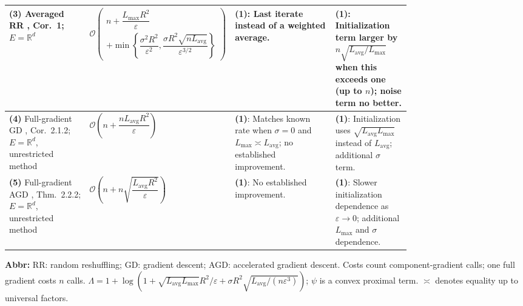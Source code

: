 \begin{table}[tp]
\begin{threeparttable}
\begin{tabularx}{\linewidth}{@{}>{\raggedright\arraybackslash}p{0.20\linewidth}>{\raggedright\arraybackslash}p{0.32\linewidth}>{\raggedright\arraybackslash}p{0.25\linewidth}>{\raggedright\arraybackslash}X@{}}
\midrule
\textbf{(3)} Averaged RR \citep{csrrLiu2026v1}, Cor.~1; $E=\mathbb{R}^d$ & $\mathcal{O}\!\left(\begin{gathered}n+\dfrac{L_{\max}R^2}{\varepsilon}\\+\min\!\left\{\dfrac{\sigma^2R^2}{\varepsilon^2},\dfrac{\sigma R^2\sqrt{nL_{\mathrm{avg}}}}{\varepsilon^{3/2}}\right\}\end{gathered}\right)$ & \textbf{(1)}: Last iterate instead of a weighted average. & \textbf{(1)}: Initialization term larger by $n\sqrt{L_{\mathrm{avg}}/L_{\max}}$ when this exceeds one (up to $n$); noise term no better. \\
\midrule
\textbf{(4)} Full-gradient GD \citep{nsscNesterov2018}, Cor.~2.1.2; $E=\mathbb{R}^d$, unrestricted method & $\mathcal{O}\!\left(n+\dfrac{nL_{\mathrm{avg}}R^2}{\varepsilon}\right)$ & \textbf{(1)}: Matches known rate when $\sigma=0$ and $L_{\max}\asymp L_{\mathrm{avg}}$; no established improvement. & \textbf{(1)}: Initialization uses $\sqrt{L_{\mathrm{avg}}L_{\max}}$ instead of $L_{\mathrm{avg}}$; additional $\sigma$ term. \\
\midrule
\textbf{(5)} Full-gradient AGD \citep{nsscNesterov2018}, Thm.~2.2.2; $E=\mathbb{R}^d$, unrestricted method & $\mathcal{O}\!\left(n+n\sqrt{\dfrac{L_{\mathrm{avg}}R^2}{\varepsilon}}\right)$ & \textbf{(1)}: No established improvement. & \textbf{(1)}: Slower initialization dependence as $\varepsilon\to0$; additional $L_{\max}$ and $\sigma$ dependence. \\
\bottomrule
\end{tabularx}
\begin{tablenotes}[flushleft]\footnotesize
\item[] \textbf{Abbr:} RR: random reshuffling; GD: gradient descent; AGD: accelerated gradient descent. Costs count component-gradient calls; one full gradient costs $n$ calls. $\Lambda=1+\log\!\left(1+\sqrt{L_{\mathrm{avg}}L_{\max}}R^2/\varepsilon+\sigma R^2\sqrt{L_{\mathrm{avg}}/(n\varepsilon^3)}\right)$; $\psi$ is a convex proximal term. $\asymp$ denotes equality up to universal factors.
\end{tablenotes}
\end{threeparttable}
\end{table}
\clearpage
